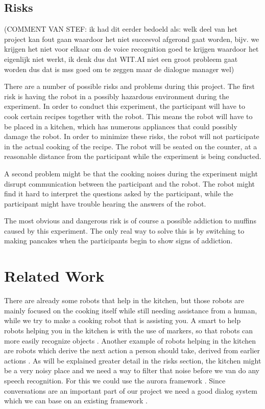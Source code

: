 \documentclass[11pt]{article} %
\begin{document}
\subsection{Risks} (COMMENT VAN STEF: ik had dit eerder bedoeld als: welk deel van het project kan fout gaan waardoor het niet succesvol afgerond gaat worden, bijv. we krijgen het niet voor elkaar om de voice recognition goed te krijgen waardoor het eigenlijk niet werkt, ik denk dus dat WIT.AI niet een groot probleem gaat worden dus dat is mss goed om te zeggen maar de dialogue manager wel)

There are a number of possible risks and problems during this project. The first risk is having the robot in a possibly hazardous environment during the experiment. In order to conduct this experiment, the participant will have to cook certain recipes together with the robot. This means the robot will have to be placed in a kitchen, which has numerous appliances that could possibly damage the robot. In order to minimize these risks, the robot will not participate in the actual cooking of the recipe. The robot will be seated on the counter, at a reasonable distance from the participant while the experiment is being conducted.

A second problem might be that the cooking noises during the experiment might disrupt communication between the participant and the robot. The robot might find it hard to interpret the questions asked by the participant, while the participant might have trouble hearing the answers of the robot.

The most obvious and dangerous risk is of course a possible addiction to muffins caused by this experiment. The only real way to solve this is by switching to making pancakes when the participants begin to show signs of addiction.


\section{Related Work}
There are already some robots that help in the kitchen, but those robots are mainly focused on the cooking itself while still needing assistance from a human\cite{bollini2013interpreting, yan2007novel, 1641754}, while we try to make a cooking robot that is assisting you.
A smart to help robots helping you in the kitchen is with the use of markers, so that robots can more easily recognize objects \cite{sugiura2010cooking}. Another example of robots helping in the kitchen are robots which derive the next action a person should take, derived from earlier actions \cite{1374787}. As will be explained greater detail in the risks section, the kitchen might be a very noisy place and we need a way to filter that noise before we van do any speech recognition. For this we could use the aurora framework \cite{hirsch2000aurora}. Since conversations are an important part of our project we need a good dialog system which we can base on an existing framework \cite{li2006dialog}.
\end{document}
